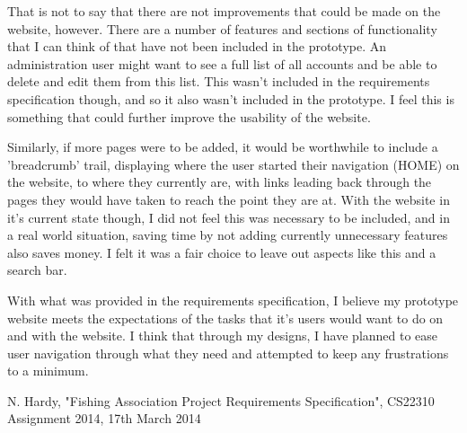 \documentclass{article}
\begin{document}
That is not to say that there are not improvements that could be made on the website, however. There are a number of features and sections of functionality that I can think of that have not been included in the prototype. An administration user might want to see a full list of all accounts and be able to delete and edit them from this list. This wasn't included in the requirements specification though, and so it also wasn't included in the prototype. I feel this is something that could further improve the usability of the website.

Similarly, if more pages were to be added, it would be worthwhile to include a 'breadcrumb' trail, displaying where the user started their navigation (HOME) on the website, to where they currently are, with links leading back through the pages they would have taken to reach the point they are at. With the website in it's current state though, I did not feel this was necessary to be included, and in a real world situation, saving time by not adding currently unnecessary features also saves money. I felt it was a fair choice to leave out aspects like this and a search bar.

With what was provided in the requirements specification, I believe my prototype website meets the expectations of the tasks that it's users would want to do on and with the website. I think that through my designs, I have planned to ease user navigation through what they need and attempted to keep any frustrations to a minimum.

\clearpage


\begin{thebibliography}{1}

 N. Hardy, "Fishing Association Project Requirements Specification", CS22310 Assignment 2014, 17th March 2014




\end{thebibliography}
\end{document}
